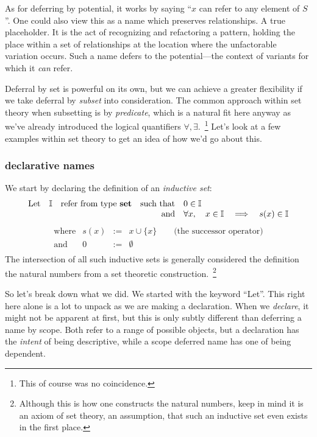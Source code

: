 \documentclass[twoside]{article}
\newcommand{\then}{\ensuremath{\quad\Longrightarrow\quad}}
\begin{document}
As for deferring by potential, it works by saying ``$ x $ can refer to any element of $ S $''. One could also view this
as a name which preserves relationships. A true placeholder. It is the act of recognizing and refactoring a pattern,
holding the place within a set of relationships at the location where the unfactorable variation occurs.
Such a name defers to the potential---the context of variants for which it \emph{can} refer.

Deferral by set is powerful on its own, but we can achieve a greater flexibility if we take deferral by \emph{subset}
into consideration. The common approach within set theory when subsetting is by \emph{predicate}, which is a natural
fit here anyway as we've already introduced the logical quantifiers $ \forall, \exists $.~\footnote{This of course
was no coincidence.} Let's look at a few examples within set theory to get an idea of how we'd go about this.

\subsubsection*{declarative names}

We start by declaring the definition of an \emph{inductive set}:
$$ \begin{array}{rrrrl}
\mbox{Let} & \mathbb{I} & \mbox{refer from type {\bf set}}	& \mbox{such that}	& 0\in\mathbb{I}		\\
			& &	& \mbox{and}		& \forall x,\quad x\in\mathbb{I}\then s(x)\in\mathbb{I}
\end{array} $$
$$ \begin{array}{rrcl}
\mbox{where}		& s(x)	& :=	& x\cup\{x\}\qquad\mbox{(the successor operator)}	\\
\mbox{and}		& 0	& :=	& \emptyset						\\
\end{array} $$
The intersection of all such inductive sets is generally considered the definition the natural numbers from a set theoretic
construction.~\footnote{Although this is how one constructs the natural numbers, keep in mind it is an axiom of set theory,
an assumption, that such an inductive set even exists in the first place.}

So let's break down what we did. We started with the keyword ``Let''. This right here alone is a lot to unpack as we are
making a declaration. When we \emph{declare}, it might not be apparent at first, but this is only subtly different than
deferring a name by scope. Both refer to a range of possible objects, but a declaration has the \emph{intent} of being
descriptive, while a scope deferred name has one of being dependent.
\end{document}
